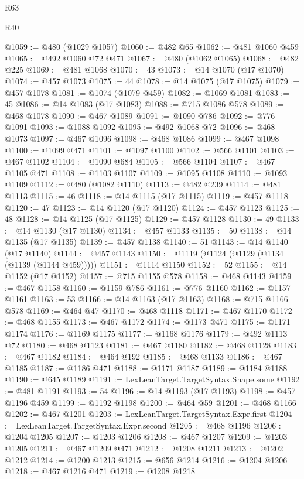 \begin{lexlean}{R63}
\begin{lexlean}{R40}
\begin{coremodule}
{{{{{{{{{{{{{{{{{{{{{{{{{{{{{{{{{{{{{{{{{{{{{{{{{{{{{{{{{{{{{{{{{{{{{{{{{{{{{{{{{{{{{{{{{{{{{{{{{{{{{{{{{{{{{@1059 := @480 (@1029 @1057)
@1060 := @482 @65
@1062 := @481 @1060 @459
@1065 := @492 @1060 @72 @471
@1067 := @480 (@1062 @1065)
@1068 := @482 @225
@1069 := @481 @1068
@1070 := 43
@1073 := @14 @1070 (@17 @1070)
@1074 := @457 @1073
@1075 := 44
@1078 := @14 @1075 (@17 @1075)
@1079 := @457 @1078
@1081 := @1074 (@1079 @459)
@1082 := @1069 @1081
@1083 := 45
@1086 := @14 @1083 (@17 @1083)
@1088 := @715 @1086 @578
@1089 := @468 @1078
@1090 := @467 @1089
@1091 := @1090 @786
@1092 := @776 @1091
@1093 := @1088 @1092
@1095 := @492 @1068 @72
@1096 := @468 @1073
@1097 := @467 @1096
@1098 := @468 @1086
@1099 := @467 @1098
@1100 := @1099 @471
@1101 := @1097 @1100
@1102 := @566 @1101
@1103 := @467 @1102
@1104 := @1090 @684
@1105 := @566 @1104
@1107 := @467 @1105 @471
@1108 := @1103 @1107
@1109 := @1095 @1108
@1110 := @1093 @1109
@1112 := @480 (@1082 @1110)
@1113 := @482 @239
@1114 := @481 @1113
@1115 := 46
@1118 := @14 @1115 (@17 @1115)
@1119 := @457 @1118
@1120 := 47
@1123 := @14 @1120 (@17 @1120)
@1124 := @457 @1123
@1125 := 48
@1128 := @14 @1125 (@17 @1125)
@1129 := @457 @1128
@1130 := 49
@1133 := @14 @1130 (@17 @1130)
@1134 := @457 @1133
@1135 := 50
@1138 := @14 @1135 (@17 @1135)
@1139 := @457 @1138
@1140 := 51
@1143 := @14 @1140 (@17 @1140)
@1144 := @457 @1143
@1150 := @1119 (@1124 (@1129 (@1134 (@1139 (@1144 @459)))))
@1151 := @1114 @1150
@1152 := 52
@1155 := @14 @1152 (@17 @1152)
@1157 := @715 @1155 @578
@1158 := @468 @1143
@1159 := @467 @1158
@1160 := @1159 @786
@1161 := @776 @1160
@1162 := @1157 @1161
@1163 := 53
@1166 := @14 @1163 (@17 @1163)
@1168 := @715 @1166 @578
@1169 := @464 @47
@1170 := @468 @1118
@1171 := @467 @1170
@1172 := @468 @1155
@1173 := @467 @1172
@1174 := @1173 @471
@1175 := @1171 @1174
@1176 := @1169 @1175
@1177 := @1168 @1176
@1179 := @492 @1113 @72
@1180 := @468 @1123
@1181 := @467 @1180
@1182 := @468 @1128
@1183 := @467 @1182
@1184 := @464 @192
@1185 := @468 @1133
@1186 := @467 @1185
@1187 := @1186 @471
@1188 := @1171 @1187
@1189 := @1184 @1188
@1190 := @645 @1189
@1191 := LexLeanTarget.TargetSyntax.Shape.some
@1192 := @481 @1191
@1193 := 54
@1196 := @14 @1193 (@17 @1193)
@1198 := @457 @1196 @459
@1199 := @1192 @1198
@1200 := @464 @59
@1201 := @468 @1166
@1202 := @467 @1201
@1203 := LexLeanTarget.TargetSyntax.Expr.first
@1204 := LexLeanTarget.TargetSyntax.Expr.second
@1205 := @468 @1196
@1206 := @1204 @1205
@1207 := @1203 @1206
@1208 := @467 @1207
@1209 := @1203 @1205
@1211 := @467 @1209 @471
@1212 := @1208 @1211
@1213 := @1202 @1212
@1214 := @1200 @1213
@1215 := @656 @1214
@1216 := @1204 @1206
@1218 := @467 @1216 @471
@1219 := @1208 @1218
}}}}}}}}}}}}}}}}}}}}}}}}}}}}}}}}}}}}}}}}}}}}}}}}}}}}}}}}}}}}}}}}}}}}}}}}}}}}}}}}}}}}}}}}}}}}}}}}}}}}}}}}}}}}}
\end{coremodule}
\end{lexlean}
\end{lexlean}
